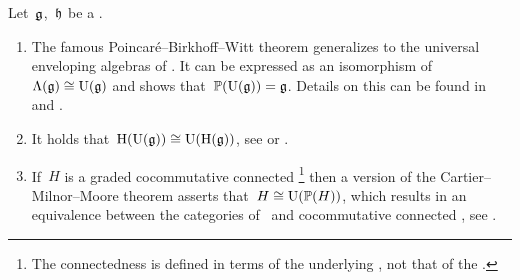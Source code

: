 \documentclass[a4paper,10pt,headings=standardclasses]{scrartcl}
\begin{document}
\begin{remark}
  Let~$\mathfrak{g}$,~$\mathfrak{h}$ be a {\dgls}.
  \begin{enumerate}
    \item
      The famous Poincaré–Birkhoff–Witt theorem generalizes to the universal enveloping algebras of {\dgls}.
      It can be expressed as an isomorphism of {\dgc}~$\operatorname{\Lambda}(\mathfrak{g}) \cong \operatorname{U}(\mathfrak{g})$ and shows that~$\mathbb{P}(\operatorname{U}(\mathfrak{g})) = \mathfrak{g}$.
      Details on this can be found in \cite[Appendix~B,Theorem~2.3]{quillen} and \cite[\S21(a)]{rational_homotopy_book}.
    \item
      It holds that~$\operatorname{H}(\operatorname{U}(\mathfrak{g})) \cong \operatorname{U}(\operatorname{H}(\mathfrak{g}))$, see \cite[Appendix~B,Proposition~2.1]{quillen} or \cite[Theorem 21.7]{rational_homotopy_book}.
    \item
      If~$H$ is a graded cocommutative connected%
      \footnote{The connectedness is defined in terms of the underlying {\dgc}, not that of the {\dga}.}
      {\dgh} then a version of the Cartier--Milnor--Moore theorem asserts that~$H \cong \operatorname{U}(\mathbb{P}(H))$, which results in an equivalence between the categories of~{\dgls} and cocommutative connected {\dghs}, see \cite[Appendix~B,Theorem~4.5]{quillen}.
  \end{enumerate}
\end{remark}
\end{document}

